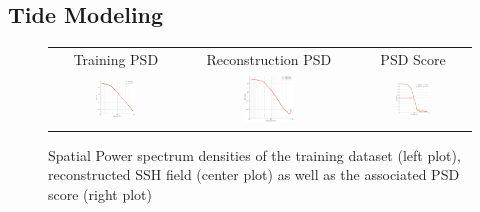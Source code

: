 \documentclass[draft]{agujournal2019}
\begin{document}
\subsection{Tide Modeling}
\label{ssec:tide}
\begin{figure}[H]
\small
\begin{center}
\setlength{\tabcolsep}{1pt}
\begin{tabular}{ccc}

\hspace{3mm} Training PSD & 
\hspace{3mm} Reconstruction PSD & 
\hspace{3mm} PSD Score  \\


\includegraphics[width=0.32\textwidth]{figures/plots/isotrop_psd_tide_train.png} &
\includegraphics[width=0.32\textwidth]{figures/plots/isotrop_psd_tide_rec.png} &
\includegraphics[width=0.32\textwidth]{figures/plots/tide_1d_psd_score.png}


\end{tabular}
\vspace{-3mm}
\caption{
Spatial Power spectrum densities of the training dataset (left plot), reconstructed SSH field (center plot) as well as the associated PSD score (right plot)}\vspace{-5mm}
\label{fig:tidepsd}
\end{center}
\end{figure}
\end{document}
